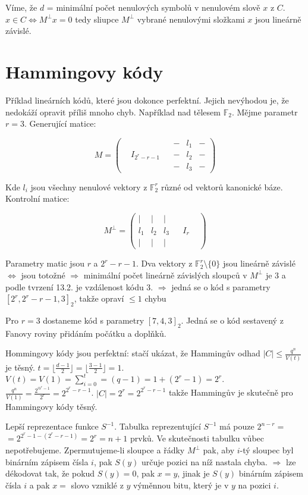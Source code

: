\begin{dukaz}
	Víme, že $d$ = minimální počet nenulových symbolů v nenulovém slově $x$ z $C$. $x \in C \Leftrightarrow M^{\bot}x = 0$ tedy sliupce $M^{\bot}$ vybrané nenulovými složkami $x$ jsou lineárně závislé.
\end{dukaz}

\section{Hammingovy kódy}

Příklad lineárních kódů, které jsou dokonce perfektní. Jejich nevýhodou je, že nedokáží opravit příliš mnoho chyb. Například nad tělesem $\mathbb{F}_{2}$. Mějme parametr $r = 3$. Generující matice:

$$
M =
\begin{pmatrix}
	&  &  & - & l_{1} & - \\
	& I_{2^{r}-r-1} &  & - & l_{2} & - \\
	&  &  & - & l_{3} & -
\end{pmatrix}
$$

Kde $l_{i}$ jsou všechny nenulové vektory z $\mathbb{F}_{2}^{r}$ různé od vektorů kanonické báze. Kontrolní matice:

$$
M^{\bot} =
\begin{pmatrix}
	| & | & | &  &  &  \\
	l_{1} & l_{2} & l_{3} &  & I_{r} &  \\
	| & | & | &  &  & 
\end{pmatrix}
$$

Parametry matic jsou $r$ a $2^{r}-r-1$. Dva vektory z $\mathbb{F}_{2}^{r} \setminus \{0\}$ jsou lineárně závislé $\Leftrightarrow$ jsou totožné $\Rightarrow$ minimální počet lineárně závislých sloupců v $M^{\bot}$ je $3$ a podle tvrzení 13.2. je vzdálenost kódu $3$. $\Rightarrow$ jedná se o kód s parametry $[2^{r}, 2^{r}-r-1, 3]_{2}$, takže opraví $\leq 1$ chybu

\begin{prikl}
	Pro  $r=3$ dostaneme kód s parametry $[7,4,3]_{2}$. Jedná se o kód sestavený z Fanovy roviny přidáním počátku a doplňků.
\end{prikl}

Hommingovy kódy jsou perfektní: stačí ukázat, že Hammingův odhad $|C| \leq \frac{q^{n}}{V(t)}$ je těsný. $t = \lfloor \frac{d-1}{2} \rfloor = \lfloor \frac{3-1}{2} \rfloor = 1$. $V(t) = V(1) = \sum_{i=0}^{t} = (q-1) = 1 + (2^{r}-1) = 2^{r}$. $\frac{q^n}{V(1)} = \frac{2^{@^{r}-1}}{2^{r}} = 2^{2^{r}-r-1}$. $|C| = 2^{r} = 2^{2^{r}-r-1}$ takže Hammingův je skutečně pro Hammingovy kódy těsný.

Lepší reprezentace funkce $S^{-1}$. Tabulka reprezentující $S^{-1}$ má pouze $2^{n-r}=$\newline $= 2^{2^{r}-1-(2^{r}-r-1)} = 2^{r} = n + 1$ prvků. Ve skutečnosti tabulku vůbec nepotřebujeme. Zpermutujeme-li sloupce a řádky $M^{\bot}$ pak, aby $i$-tý sloupec byl binárním zápisem čísla $i$, pak $S(y)$ určuje pozici na níž nastala chyba. $\Rightarrow$ lze dékodovat tak, že pokud $S(y) = 0$, pak $x=y$, jinak je $S(y)$ binárním zápisem čísla $i$ a pak $x =$ slovo vzniklé z $y$ výměnnou bitu, který je v $y$ na pozici $i$.